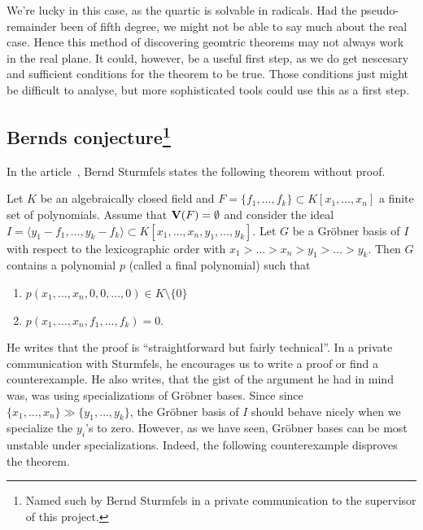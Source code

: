 \begin{example}
  We're lucky in this case, as the quartic is solvable in radicals. Had the pseudo-remainder been of fifth degree, we might not be able to say much about the real case. Hence this method of discovering geomtric theorems may not always work in the real plane. It could, however, be a useful first step, as we do get nescesary and sufficient conditions for the theorem to be true. Those conditions just might be difficult to analyse, but more sophisticated tools could use this as a first step.
\end{example}













\subsection[Bernds conjecture]{Bernds conjecture\footnote{Named such by Bernd Sturmfels in a private communication to the supervisor of this project.}}\label{sec:bernd}
In the article~\cite{sturmfels}, Bernd Sturmfels states the following theorem without proof.

\begin{theorem}
  Let $K$ be an algebraically closed field and $F = \{f_{1}, \dots, f_{k}\} \subset K[x_{1}, \dots, x_{n}]$ a finite set of polynomials. Assume that $\operatorname{\mathbf V}(F) = \emptyset$ and consider the ideal $I = \langle y_{1} - f_{1}, \dots, y_{k} - f_{k} \rangle \subset K[x_{1}, \dots, x_{n}, y_{1}, \dots, y_{k}]$. Let $G$ be a Gröbner basis of $I$ with respect to the lexicographic order with $x_{1} > \dots > x_{n} > y_{1} > \dots > y_{k}$. Then $G$ contains a polynomial $p$ (called a final polynomial) such that
  \begin{enumerate}
    \item $p(x_{1}, \dots, x_{n}, 0, 0, \dots, 0) \in K \setminus \{0\}$
    \item $p(x_{1}, \dots, x_{n}, f_{1}, \dots, f_{k}) = 0$.
  \end{enumerate}
\end{theorem}

He writes that the proof is ``straightforward but fairly technical''. In a private communication\cite{NL_to_BS} with Sturmfels, he encourages us to write a proof or find a counterexample. He also writes, that the gist of the argument he had in mind was, was using specializations of Gröbner bases. Since since $\{x_{1}, \dots, x_{n}\} \gg \{y_{1}, \dots, y_{k}\}$, the Gröbner basis of $I$ should behave nicely when we specialize the $y_{i}$'s to zero. However, as we have seen, Gröbner bases can be most unstable under specializations. Indeed, the following counterexample disproves the theorem.

